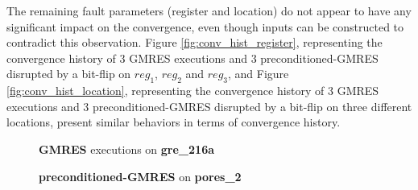 The remaining fault parameters (register and location) do not appear to have any significant impact on the convergence, even though inputs can be constructed to contradict this observation. Figure \ref{fig:conv_hist_register}, representing the convergence history of 3 GMRES executions and 3 preconditioned-GMRES disrupted by a bit-flip on $reg_1$, $reg_2$ and $reg_3$, and Figure \ref{fig:conv_hist_location}, representing the convergence history of 3 GMRES executions and 3 preconditioned-GMRES disrupted by a bit-flip on three different locations, present similar behaviors in terms of convergence history.



\begin{figure}[h]
	\centering
    
\begin{minipage}[b]{0.45\linewidth}
\centering
\textbf{GMRES} executions on \textbf{gre_216a} 
\end{minipage}
\quad
\begin{minipage}{0.45\linewidth}
\centering
\textbf{preconditioned-GMRES} on \textbf{pores_2}
\end{minipage}\\



\end{figure}
